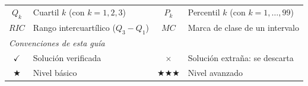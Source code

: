 \documentclass[11pt, letterpaper]{article}
\begin{document}
\begin{tcolorbox}[importantbox, title={Glosario de simbolog\'ia}]
\begin{center}
\begin{tabular}{c p{4.5cm} | c p{4.5cm}}
\textcolor{zenitgold}{$Q_k$} & \textcolor{zenitgold}{Cuartil $k$ (con $k=1,2,3$)} &
\textcolor{zenitgold}{$P_k$} & \textcolor{zenitgold}{Percentil $k$ (con $k=1,\ldots,99$)}\\
\textcolor{zenitgold}{$RIC$} & \textcolor{zenitgold}{Rango intercuart\'ilico ($Q_3-Q_1$)} &
\textcolor{zenitgold}{$MC$} & \textcolor{zenitgold}{Marca de clase de un intervalo}\\[4pt]
\multicolumn{4}{l}{\textit{Convenciones de esta gu\'ia}}\\
$\checkmark$ & Soluci\'on verificada &
$\times$ & Soluci\'on extra\~na: se descarta\\
$\bigstar$ & Nivel b\'asico &
$\bigstar\bigstar\bigstar$ & Nivel avanzado\\
\bottomrule
\end{tabular}
\end{center}
\end{tcolorbox}

\medskip

\end{document}
